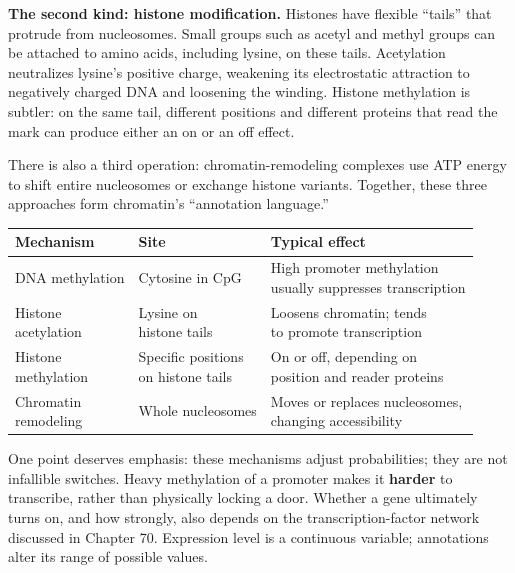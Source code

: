 \textbf{The second kind: histone modification.} Histones have flexible ``tails'' that protrude from nucleosomes. Small groups such as acetyl and methyl groups can be attached to amino acids, including lysine, on these tails. Acetylation neutralizes lysine's positive charge, weakening its electrostatic attraction to negatively charged DNA and loosening the winding. Histone methylation is subtler: on the same tail, different positions and different proteins that read the mark can produce either an on or an off effect.

There is also a third operation: chromatin-remodeling complexes use ATP energy to shift entire nucleosomes or exchange histone variants. Together, these three approaches form chromatin's ``annotation language.''

\begin{table}[htbp]
\centering
\begin{tabular}{lll}
\toprule
Mechanism & Site & Typical effect \\
\midrule
DNA methylation & Cytosine in CpG & \shortstack[l]{High promoter methylation\\usually suppresses transcription} \\
\shortstack[l]{Histone\\acetylation} & \shortstack[l]{Lysine on\\histone tails} & \shortstack[l]{Loosens chromatin; tends\\to promote transcription} \\
\shortstack[l]{Histone\\methylation} & \shortstack[l]{Specific positions\\on histone tails} & \shortstack[l]{On or off, depending on\\position and reader proteins} \\
\shortstack[l]{Chromatin\\remodeling} & Whole nucleosomes & \shortstack[l]{Moves or replaces nucleosomes,\\changing accessibility} \\
\bottomrule
\end{tabular}
\end{table}

One point deserves emphasis: these mechanisms adjust probabilities; they are not infallible switches. Heavy methylation of a promoter makes it \textbf{harder} to transcribe, rather than physically locking a door. Whether a gene ultimately turns on, and how strongly, also depends on the transcription-factor network discussed in Chapter 70. Expression level is a continuous variable; annotations alter its range of possible values.

